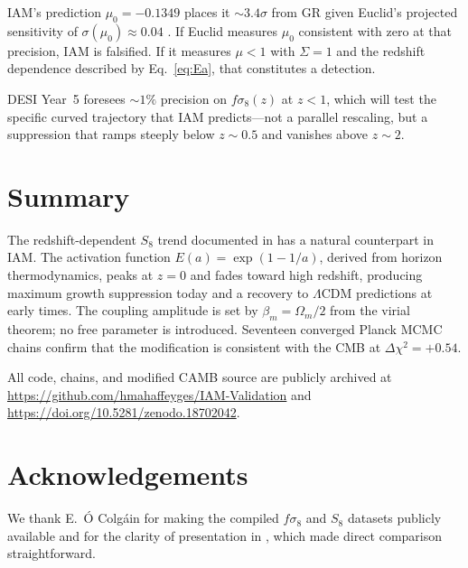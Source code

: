 \documentclass[12pt,a4paper]{article}
\begin{document}
IAM's prediction $\mu_0 = -0.1349$ places it $\sim 3.4\sigma$ from GR
given Euclid's projected sensitivity of $\sigma(\mu_0) \approx 0.04$
\citep{EuclidForecast}.  If Euclid measures $\mu_0$ consistent with zero
at that precision, IAM is falsified.  If it measures $\mu < 1$ with
$\Sigma = 1$ and the redshift dependence described by Eq.~\eqref{eq:Ea},
that constitutes a detection.

DESI Year~5 foresees $\sim 1\%$ precision on $f\sigma_8(z)$ at $z < 1$,
which will test the specific curved trajectory that IAM predicts---not a
parallel rescaling, but a suppression that ramps steeply below $z \sim 0.5$
and vanishes above $z \sim 2$.

\section{Summary}

The redshift-dependent $S_8$ trend documented in \citet{Adil2023} has a
natural counterpart in IAM.  The activation function $E(a) = \exp(1-1/a)$,
derived from horizon thermodynamics, peaks at $z = 0$ and fades toward high
redshift, producing maximum growth suppression today and a recovery to
$\Lambda$CDM predictions at early times.  The coupling amplitude is set by
$\beta_m = \Omega_m/2$ from the virial theorem; no free parameter is
introduced.  Seventeen converged Planck MCMC chains confirm that the
modification is consistent with the CMB at $\Delta\chi^2 = +0.54$.

All code, chains, and modified CAMB source are publicly archived at
\url{https://github.com/hmahaffeyges/IAM-Validation} and
\url{https://doi.org/10.5281/zenodo.18702042}.

\section*{Acknowledgements}

We thank E.~\'{O} Colg\'{a}in for making the compiled $f\sigma_8$ and
$S_8$ datasets publicly available and for the clarity of presentation
in \citet{Adil2023}, which made direct comparison straightforward.


\end{document}
